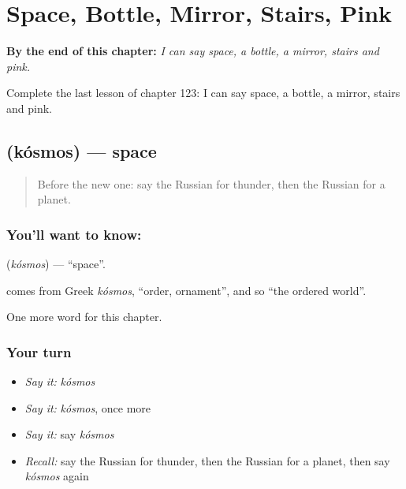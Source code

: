 
\chapter{Space, Bottle, Mirror, Stairs, Pink}
\label{ch:ru-space-bottle-mirror-stairs-pink}

\begin{chapteropening}
\textbf{By the end of this chapter:} \emph{I can say space, a bottle, a mirror, stairs and pink.}

Complete the last lesson of chapter 123: I can say space, a bottle, a mirror, stairs and pink.
\end{chapteropening}

\section[\texorpdfstring{\ru{космос} (kósmos)}{космос (kósmos)}]{ (kósmos) — space}

\label{lesson:RU-C123-space}



\begin{quote}
Before the new one: say the Russian for thunder, then the Russian for a planet.
\end{quote}

\subsection*{You'll want to know: }
\textbf{} (\emph{kósmos}) — \textquotedblleft{}space\textquotedblright{}.

\begin{cousinweb}
\textbf{} comes from Greek \emph{kósmos}, \textquotedblleft{}order, ornament\textquotedblright{}, and so \textquotedblleft{}the ordered world\textquotedblright{}.
\end{cousinweb}

\begin{grammarlens}[title={What you've built}]
One more word for this chapter.
\end{grammarlens}

\subsection*{Your turn}
\begin{itemize}
\raggedright
  \item \emph{Say it:} \emph{kósmos}
  \item \emph{Say it:} \emph{kósmos}, once more
  \item \emph{Say it:} say \emph{kósmos}
  \item \emph{Recall:} say the Russian for thunder, then the Russian for a planet, then say \emph{kósmos} again
\end{itemize}

